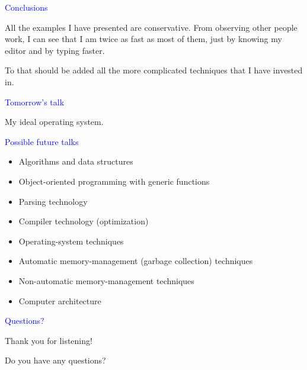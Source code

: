 \documentclass{slides}
\newcommand{\ti}[1]{\begin{center}\Large{\textcolor{blue}{#1}}\end{center}}
\begin{document}
\begin{slide}\ti{Conclusions}

All the examples I have presented are conservative.  From observing
other people work, I can see that I am twice as fast as most of them,
just by knowing my editor and by typing faster.

To that should be added all the more complicated techniques that I
have invested in.

\vfill\end{slide}
\begin{slide}\ti{Tomorrow's talk}

My ideal operating system.

\vfill\end{slide}
\begin{slide}\ti{Possible future talks}

  \begin{itemize}
  \item Algorithms and data structures
  \item Object-oriented programming with generic functions
  \item Parsing technology
  \item Compiler technology (optimization)
  \item Operating-system techniques
  \item Automatic memory-management (garbage collection) techniques
  \item Non-automatic memory-management techniques
  \item Computer architecture
  \end{itemize}

\vfill\end{slide}
\begin{slide}\ti{Questions?}

Thank you for listening!

Do you have any questions?

\vfill\end{slide}


\end{document}
